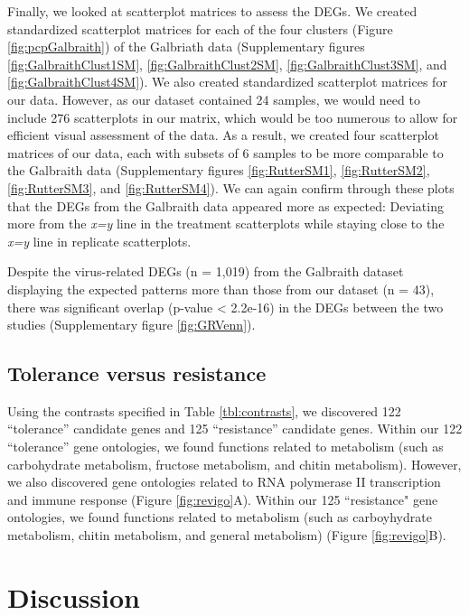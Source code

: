 \documentclass[11pt,a4paper,oldfontcommands,openany]{memoir}
\numberwithin{equation}{section} %
\begin{document}
Finally, we looked at scatterplot matrices to assess the DEGs. We created standardized scatterplot matrices for each of the four clusters (Figure \ref{fig:pcpGalbraith}) of the Galbriath data (Supplementary figures \ref{fig:GalbraithClust1SM}, \ref{fig:GalbraithClust2SM}, \ref{fig:GalbraithClust3SM}, and \ref{fig:GalbraithClust4SM}). We also created standardized scatterplot matrices for our data. However, as our dataset contained 24 samples, we would need to include 276 scatterplots in our matrix, which would be too numerous to allow for efficient visual assessment of the data. As a result, we created four scatterplot matrices of our data, each with subsets of 6 samples to be more comparable to the Galbraith data (Supplementary figures \ref{fig:RutterSM1}, \ref{fig:RutterSM2}, \ref{fig:RutterSM3}, and \ref{fig:RutterSM4}). We can again confirm through these plots that the DEGs from the Galbraith data appeared more as expected: Deviating more from the \textit{x=y} line in the treatment scatterplots while staying close to the \textit{x=y} line in replicate scatterplots.

Despite the virus-related DEGs (n = 1,019) from the Galbraith dataset displaying the expected patterns more than those from our dataset (n = 43), there was significant overlap (p-value < 2.2e-16) in the DEGs between the two studies (Supplementary figure \ref{fig:GRVenn}).

\subsection{Tolerance versus resistance}

Using the contrasts specified in Table \ref{tbl:contrasts}, we discovered 122 ``tolerance'' candidate genes and 125 ``resistance'' candidate genes. Within our 122 ``tolerance'' gene ontologies, we found functions related to metabolism (such as carbohydrate metabolism, fructose metabolism, and chitin metabolism). However, we also discovered gene ontologies related to RNA polymerase II transcription and immune response (Figure \ref{fig:revigo}A). Within our 125 ``resistance" gene ontologies, we found functions related to metabolism (such as carboyhydrate metabolism, chitin metabolism, and general metabolism) (Figure \ref{fig:revigo}B). 

\section{Discussion}
\end{document}
